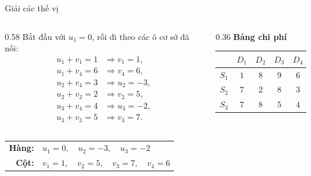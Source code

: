\documentclass[10pt]{beamer}
\begin{document}
\begin{frame}{Giải các thế vị}
    \begin{columns}[c]
        \begin{column}{0.58\textwidth}
            Bắt đầu với $u_1=0$, rồi đi theo các ô cơ sở đã nối:
            \[
            \begin{aligned}
                u_1+v_1=1 &\Rightarrow v_1=1,\\
                u_1+v_4=6 &\Rightarrow v_4=6,\\
                u_2+v_4=3 &\Rightarrow u_2=-3,\\
                u_2+v_2=2 &\Rightarrow v_2=5,\\
                u_3+v_4=4 &\Rightarrow u_3=-2,\\
                u_3+v_3=5 &\Rightarrow v_3=7.
            \end{aligned}
            \]
        \end{column}
        \begin{column}{0.36\textwidth}
            \centering
            \scriptsize
            \textbf{Bảng chi phí}\\[0.08cm]
            \renewcommand{\arraystretch}{1.2}
            \begin{tabular}{c|cccc}
                & $D_1$ & $D_2$ & $D_3$ & $D_4$\\
                \hline
                $S_1$ & \cellcolor{occupied}$1$ & $8$ & $9$ & \cellcolor{epsiloncell}$6$\\
                $S_2$ & $7$ & \cellcolor{occupied}$2$ & $8$ & \cellcolor{occupied}$3$\\
                $S_3$ & $7$ & $8$ & \cellcolor{occupied}$5$ & \cellcolor{occupied}$4$
            \end{tabular}
        \end{column}
    \end{columns}

    \vspace{0.1cm}
    \begin{center}
        \renewcommand{\arraystretch}{1.2}
        \begin{tabular}{rl}
            \textbf{Hàng:} &
            $u_1=0,\quad u_2=-3,\quad u_3=-2$\\
            \textbf{Cột:} &
            $v_1=1,\quad v_2=5,\quad v_3=7,\quad v_4=6$
        \end{tabular}
    \end{center}
\end{frame}
\end{document}
